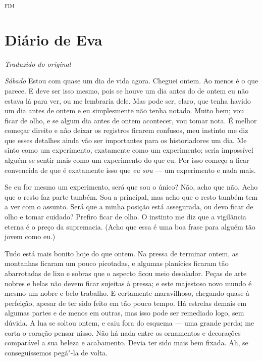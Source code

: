 \begin{center}
\textsc{fim}
\end{center}




\chapter{Diário de Eva}
\medskip

{\small
\hfill\textit{Traduzido do original}
}
\break

\textit{Sábado} Estou com quase um dia de vida agora. Cheguei ontem. Ao menos é o que
parece. E deve ser isso mesmo, pois se houve um dia antes do de ontem
eu não estava lá para ver, ou me lembraria dele. Mas pode ser, claro, que tenha
havido um dia antes de ontem e eu simplesmente não tenha notado. Muito
bem; vou ficar de olho, e se algum dia antes de ontem acontecer, vou tomar
nota. É melhor começar direito e não deixar os registros ficarem confusos,
meu instinto me diz que esses detalhes ainda vão ser importantes para os
historiadores um dia. Me sinto como um experimento, exatamente como um
experimento; seria impossível alguém se sentir mais como um experimento do que
eu. Por isso começo a ficar convencida de que é exatamente isso que \textit{eu sou} --- um
experimento e nada mais.

Se eu for mesmo um experimento, será que sou o único? Não, acho que não. Acho que o
resto faz parte também. Sou a principal, mas acho que o resto também tem a ver
com o assunto. Será que a minha posição está assegurada, ou devo ficar de olho e
tomar cuidado? Prefiro ficar de olho. O instinto me diz que a vigilância
eterna é o preço da supremacia. (Acho que essa é uma boa frase para alguém tão
jovem como eu.)

Tudo está mais bonito hoje do que ontem. Na pressa de terminar ontem, as
montanhas ficaram um pouco picotadas, e algumas planícies ficaram tão
abarrotadas de lixo e sobras que o aspecto ficou meio desolador. Peças de arte
nobres e belas não devem ficar sujeitas à pressa; e este majestoso novo mundo é
mesmo um nobre e belo trabalho. E certamente maravilhoso, chegando quase à
perfeição, apesar de ter sido feito em tão pouco tempo. Há estrelas demais em algumas partes
e de menos em outras, mas isso pode ser remediado logo, sem dúvida. A lua se
soltou ontem, e caiu fora do esquema --- uma grande perda; me corta o
coração pensar nisso. Não há nada entre os ornamentos e decorações
comparável a sua beleza e acabamento. Devia ter sido mais bem fixada. Ah, se
conseguíssemos pegá"-la de volta.

